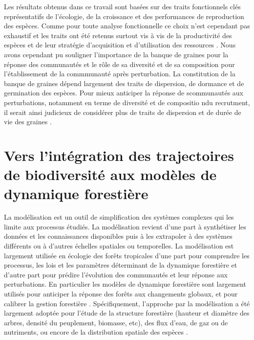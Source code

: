 \documentclass[
  11pt,
  french,
  A4paper,
  extrafontsizes,onecolumn,openright
  ]{memoir}
\begin{document}
Les résultats obtenus dans ce travail sont basées sur des traits
fonctionnels clés représentatifs de l'écologie, de la croissance et des
performances de reproduction des espèces. Comme pour toute analyse
fonctionnelle ce choix n'est cependant pas exhaustif et les traits ont
été retenus surtout vis à vis de la productivité des espèces et de leur
stratégie d'acquisition et d'utilisation des ressources
\autocites{Reich2014}{Kunstler2016}. Nous avons cependant pu souligner
l'importance de la banque de graines pour la réponse des communautés et
le rôle de sa diversité et de sa composition pour l'établissement de la
commmunauté après perturbation. La constitution de la banque de graines
dépend largement des traits de dispersion, de dormance et de germination
des espèces. Pour mieux anticiper la réponse de scommunautés aux
perturbations, notamment en terme de diversité et de compositio ndu
recrutment, il serait ainsi judicieux de considérer plus de traits de
dispersion et de durée de vie des graines
\autocites{Verdu2005}{Schleuning2016}{Yguel_inprep}.

\section{Vers l'intégration des trajectoires de biodiversité aux modèles
de dynamique
forestière}\label{vers-lintegration-des-trajectoires-de-biodiversite-aux-modeles-de-dynamique-forestiere}

La modélisation est un outil de simplification des systèmes complexes
qui les limite aux processus étudiés. La modélisation revient d'une part
à synthétiser les données et les connaissances disponibles puis à les
extrapoler à des systèmes différents ou à d'autres échelles spatiales ou
temporelles. La modélisation est largement utilisée en écologie des
forêts tropicales d'une part pour comprendre les processus, les lois et
les paramètres déterminant de la dynamique forestière et d'autre part
pour prédire l'évolution des communautés et leur réponse aux
perturbations. En particulier les modèles de dynamique forestière sont
largement utilisés pour anticiper la réponse des forêts aux changements
globaux, et pour calibrer la gestion forestière
\autocite{Gourlet-Fleury2005}. Spécifiquement, l'approche par la
modélisation a été largement adoptée pour l'étude de la structure
forestière (hauteur et diamètre des arbres, densité du peuplement,
biomasse, etc), des flux d'eau, de gaz ou de nutriments, ou encore de la
distribution spatiale des espèces
\autocites{Piponiot2016}{Rutishauser2016}{Grimm2017}.
\end{document}

